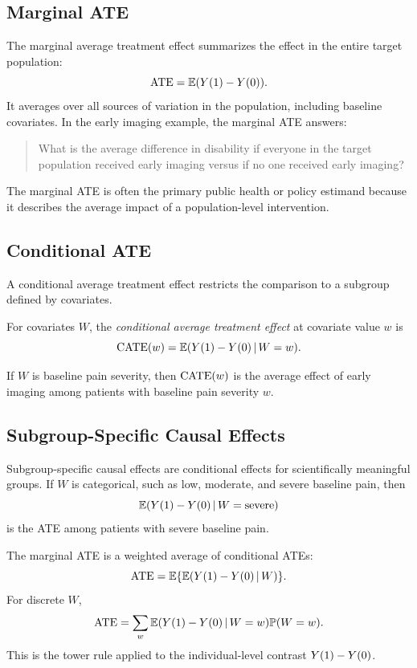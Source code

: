 \label{lec:2-7}

\subsection{Marginal ATE}

The marginal average treatment effect summarizes the effect in the entire target population:
\[
\operatorname{ATE}=\mathbb{E}(Y(1)-Y(0)).
\]
It averages over all sources of variation in the population, including baseline covariates. In the early imaging example, the marginal ATE answers:
\begin{quote}
What is the average difference in disability if everyone in the target population received early imaging versus if no one received early imaging?
\end{quote}

The marginal ATE is often the primary public health or policy estimand because it describes the average impact of a population-level intervention.

\subsection{Conditional ATE}

A conditional average treatment effect restricts the comparison to a subgroup defined by covariates.

\begin{definition}
For covariates $W$, the \emph{conditional average treatment effect} at covariate value $w$ is
\[
\operatorname{CATE}(w)=\mathbb{E}(Y(1)-Y(0)\,\vert\, W=w).
\]
\end{definition}

If $W$ is baseline pain severity, then $\operatorname{CATE}(w)$ is the average effect of early imaging among patients with baseline pain severity $w$.

\subsection{Subgroup-Specific Causal Effects}

Subgroup-specific causal effects are conditional effects for scientifically meaningful groups. If $W$ is categorical, such as low, moderate, and severe baseline pain, then
\[
\mathbb{E}(Y(1)-Y(0)\,\vert\, W=\text{severe})
\]
is the ATE among patients with severe baseline pain.

The marginal ATE is a weighted average of conditional ATEs:
\[
\operatorname{ATE}
=\mathbb{E}\{\mathbb{E}(Y(1)-Y(0)\,\vert\, W)\}.
\]
For discrete $W$,
\[
\operatorname{ATE}
=
\sum_w \mathbb{E}(Y(1)-Y(0)\,\vert\, W=w)\mathbb{P}(W=w).
\]
This is the tower rule applied to the individual-level contrast $Y(1)-Y(0)$.


